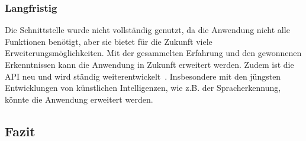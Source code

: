 \subsubsection{Langfristig}\label{subsubsec:Langfristig}
Die Schnittstelle wurde nicht vollständig genutzt, da die Anwendung nicht alle Funktionen benötigt, aber sie bietet für die Zukunft viele Erweiterungsmöglichkeiten.
Mit der gesammelten Erfahrung und den gewonnenen Erkenntnissen kann die Anwendung in Zukunft erweitert werden.
Zudem ist die API neu und wird ständig weiterentwickelt~\cite{microsoft-graph-api-version}.
Insbesondere mit den jüngsten Entwicklungen von künstlichen Intelligenzen, wie z.B. der Spracherkennung, könnte die Anwendung erweitert werden.

\subsection{Fazit}\label{subsec:fazit}
%
